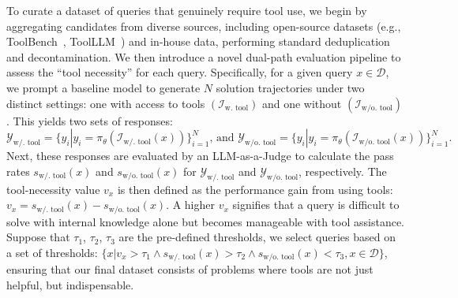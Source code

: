 To curate a dataset of queries that genuinely require tool use, we begin by aggregating candidates from diverse sources, including open-source datasets (e.g., ToolBench~\citep{xu2023tool}, ToolLLM~\citep{qin2023toolllm}) and in-house data, performing standard deduplication and decontamination. 
We then introduce a novel dual-path evaluation pipeline to assess the ``tool necessity'' for each query. 
Specifically, for a given query $x\in\mathcal{D}$, we prompt a baseline model to generate $N$ solution trajectories under two distinct settings: one with access to tools $(\mathcal{I}_{\text{w. tool}})$ and one without $(\mathcal{I}_{\text{w/o. tool}})$. 
This yields two sets of responses:
\begin{equation}
    \mathcal{Y}_{\text{w/. tool}}=\{y_i|y_i=\pi_{\theta}(\mathcal{I}_{\text{w/. tool}}(x))\}_{i=1}^{N}
    \text{, and }
    \mathcal{Y}_{\text{w/o. tool}}=\{y_i|y_i=\pi_{\theta}(\mathcal{I}_{\text{w/o. tool}}(x))\}_{i=1}^{N}\text{.}
\end{equation}
Next, these responses are evaluated by an LLM-as-a-Judge to calculate the pass rates $s_{\text{w/. tool}}(x)$ and $s_{\text{w/o. tool}}(x)$ for $\mathcal{Y}_{\text{w/. tool}}$ and $\mathcal{Y}_{\text{w/o. tool}}$, respectively.
The tool-necessity value $v_x$ is then defined as the performance gain from using tools: $v_x = s_{\text{w/. tool}}(x) - s_{\text{w/o. tool}}(x)$.
A higher $v_x$ signifies that a query is difficult to solve with internal knowledge alone but becomes manageable with tool assistance.
Suppose that $\tau_1$, $\tau_2$, $\tau_3$ are the pre-defined thresholds, we select queries based on a set of thresholds: $\{x|v_x>\tau_1\land s_{\text{w/. tool}}(x)>\tau_2\land s_{\text{w/o. tool}}(x)<\tau_3, x\in\mathcal{D}\}$, ensuring that our final dataset consists of problems where tools are not just helpful, but indispensable.
